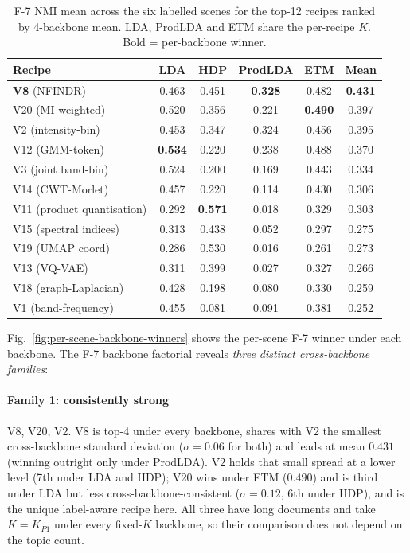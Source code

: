 \documentclass[journal,a4paper,10pt]{IEEEtran}
\begin{document}
\begin{table}[ht]
\caption{F-7 NMI mean across the six labelled scenes for the top-12
recipes ranked by 4-backbone mean. LDA, ProdLDA and ETM share the
per-recipe $K$. Bold = per-backbone winner.}
\label{tab:f7-backbone}
\centering
\scriptsize
\setlength{\tabcolsep}{4pt}
\begin{tabular}{lccccc}
\toprule
Recipe & LDA & HDP & ProdLDA & ETM & \textbf{Mean} \\
\midrule
\textbf{V8}  (NFINDR)       & 0.463 & 0.451 & \textbf{0.328} & 0.482 & \textbf{0.431} \\
V20 (MI-weighted)           & 0.520 & 0.356 & 0.221 & \textbf{0.490} & 0.397 \\
V2  (intensity-bin)         & 0.453 & 0.347 & 0.324 & 0.456 & 0.395 \\
V12 (GMM-token)             & \textbf{0.534} & 0.220 & 0.238 & 0.488 & 0.370 \\
V3  (joint band-bin)        & 0.524 & 0.200 & 0.169 & 0.443 & 0.334 \\
V14 (CWT-Morlet)            & 0.457 & 0.220 & 0.114 & 0.430 & 0.306 \\
V11 (product quantisation)  & 0.292 & \textbf{0.571} & 0.018 & 0.329 & 0.303 \\
V15 (spectral indices)      & 0.313 & 0.438 & 0.052 & 0.297 & 0.275 \\
V19 (UMAP coord)            & 0.286 & 0.530 & 0.016 & 0.261 & 0.273 \\
V13 (VQ-VAE)                & 0.311 & 0.399 & 0.027 & 0.327 & 0.266 \\
V18 (graph-Laplacian)       & 0.428 & 0.198 & 0.080 & 0.330 & 0.259 \\
V1  (band-frequency)        & 0.455 & 0.081 & 0.091 & 0.381 & 0.252 \\
\bottomrule
\end{tabular}
\end{table}

Fig.~\ref{fig:per-scene-backbone-winners} shows the per-scene F-7 winner
under each backbone. The F-7 backbone factorial reveals
\emph{three distinct cross-backbone families}:

\paragraph{Family 1: consistently strong} V8, V20, V2. V8 is top-4
under every backbone, shares with V2 the smallest cross-backbone
standard deviation ($\sigma = 0.06$ for both) and leads at mean $0.431$
(winning outright only under ProdLDA). V2 holds that small spread at a
lower level (7th under LDA and HDP); V20 wins under ETM ($0.490$) and is
third under LDA but less cross-backbone-consistent ($\sigma = 0.12$, 6th
under HDP), and is the unique label-aware recipe here. All three have
long documents and take $K = K_{P1}$ under every fixed-$K$ backbone, so
their comparison does not depend on the topic count.
\end{document}
